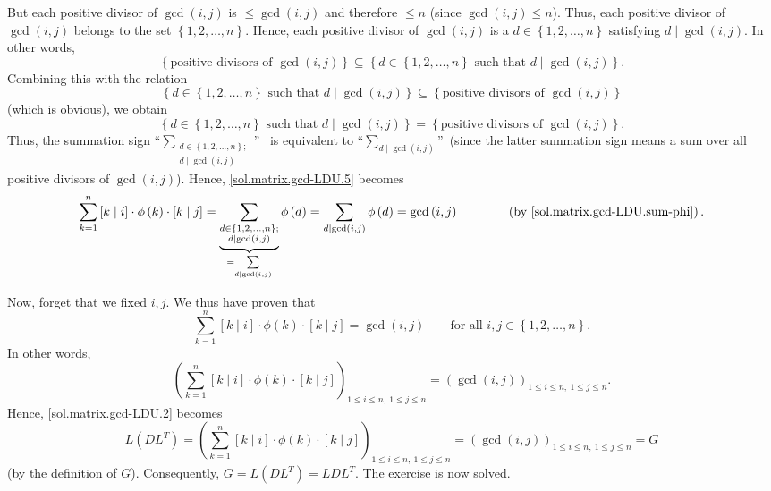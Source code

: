 \documentclass[paper=a4, fontsize=12pt]{scrartcl}%
\let\sumnonlimits\sum
\renewcommand{\sum}{\sumnonlimits\limits}
\theoremstyle{plainsl}
\theoremstyle{definition}
\theoremstyle{remark}
\begin{document}
But each positive divisor of $\gcd\left(  i,j\right)  $ is $\leq\gcd\left(
i,j\right)  $ and therefore $\leq n$ (since $\gcd\left(  i,j\right)  \leq n$).
Thus, each positive divisor of $\gcd\left(  i,j\right)  $ belongs to the set
$\left\{  1,2,\ldots,n\right\}  $. Hence, each positive divisor of
$\gcd\left(  i,j\right)  $ is a $d\in\left\{  1,2,\ldots,n\right\}  $
satisfying $d\mid\gcd\left(  i,j\right)  $. In other words,%
\[
\left\{  \text{positive divisors of }\gcd\left(  i,j\right)  \right\}
\subseteq\left\{  d\in\left\{  1,2,\ldots,n\right\}  \text{ such that }%
d\mid\gcd\left(  i,j\right)  \right\}  .
\]
Combining this with the relation%
\[
\left\{  d\in\left\{  1,2,\ldots,n\right\}  \text{ such that }d\mid\gcd\left(
i,j\right)  \right\}  \subseteq\left\{  \text{positive divisors of }%
\gcd\left(  i,j\right)  \right\}
\]
(which is obvious), we obtain%
\[
\left\{  d\in\left\{  1,2,\ldots,n\right\}  \text{ such that }d\mid\gcd\left(
i,j\right)  \right\}  =\left\{  \text{positive divisors of }\gcd\left(
i,j\right)  \right\}  .
\]
Thus, the summation sign \textquotedblleft$\sum_{\substack{d\in\left\{
1,2,\ldots,n\right\}  ;\\d\mid\gcd\left(  i,j\right)  }}$\textquotedblright%
\ is equivalent to \textquotedblleft$\sum_{d\mid\gcd\left(  i,j\right)  }%
$\textquotedblright\ (since the latter summation sign means a sum over all
positive divisors of $\gcd\left(  i,j\right)  $). Hence,
\eqref{sol.matrix.gcd-LDU.5} becomes%
\[
\sum_{k=1}^{n}\left[  k\mid i\right]  \cdot\phi\left(  k\right)  \cdot\left[
k\mid j\right]  =\underbrace{\sum_{\substack{d\in\left\{  1,2,\ldots
,n\right\}  ;\\d\mid\gcd\left(  i,j\right)  }}}_{=\sum_{d\mid\gcd\left(
i,j\right)  }}\phi\left(  d\right)  =\sum_{d\mid\gcd\left(  i,j\right)  }%
\phi\left(  d\right)  =\gcd\left(  i,j\right)  \qquad\qquad\left(  \text{by
\eqref{sol.matrix.gcd-LDU.sum-phi}}\right)  .
\]


Now, forget that we fixed $i,j$. We thus have proven that
\[
\sum_{k=1}^{n}\left[  k\mid i\right]  \cdot\phi\left(  k\right)  \cdot\left[
k\mid j\right]  =\gcd\left(  i,j\right)  \qquad\text{for all }i,j\in\left\{
1,2,\ldots,n\right\}  .
\]
In other words,%
\[
\left(  \sum_{k=1}^{n}\left[  k\mid i\right]  \cdot\phi\left(  k\right)
\cdot\left[  k\mid j\right]  \right)  _{1\leq i\leq n,\ 1\leq j\leq n}=\left(
\gcd\left(  i,j\right)  \right)  _{1\leq i\leq n,\ 1\leq j\leq n}.
\]
Hence, \eqref{sol.matrix.gcd-LDU.2} becomes%
\[
L\left(  DL^{T}\right)  =\left(  \sum_{k=1}^{n}\left[  k\mid i\right]
\cdot\phi\left(  k\right)  \cdot\left[  k\mid j\right]  \right)  _{1\leq i\leq
n,\ 1\leq j\leq n}=\left(  \gcd\left(  i,j\right)  \right)  _{1\leq i\leq
n,\ 1\leq j\leq n}=G
\]
(by the definition of $G$). Consequently, $G=L\left(  DL^{T}\right)  =LDL^{T}%
$. The exercise is now solved.
\end{document}
